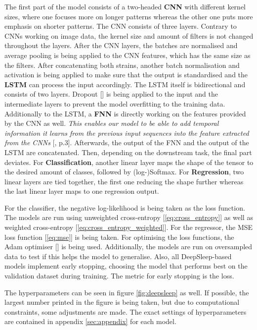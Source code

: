 \documentclass[11pt]{scrartcl}
\begin{document}
The first part of the model consists of a two-headed \textcolor{viridis1}{\textbf{CNN}} with different kernel sizes, where one focuses more on longer patterns whereas the other one puts more emphasis on shorter patterns. The CNN consists of three layers. Contrary to CNNs working on image data, the kernel size and amount of filters is not changed throughout the layers. After the CNN layers, the batches are normalised and average pooling is being applied to the CNN features, which has the same size as the filters. After concatenating both strains, another batch normalisation and activation is being applied to make sure that the output is standardised and the \textcolor{viridis3}{\textbf{LSTM}} can process the input accordingly. The LSTM itself is bidirectional and consists of two layers. Dropout [\cite{dropout}] is being applied to the input and the intermediate layers to prevent the model overfitting to the training data. Additionally to the LSTM, a \textcolor{viridis5}{\textbf{FNN}} is directly working on the features provided by the CNN as well. \textit{This enables our model to be able to add temporal information it learns from the previous input sequences into the feature extracted from the CNNs} [\cite{deepsleep}, p.3]. Afterwards, the output of the FNN and the output of the LSTM are concatenated. Then, depending on the downstream task, the final part deviates. For \textcolor{viridis7}{\textbf{Classification}}, another linear layer maps the shape of the tensor to the desired amount of classes, followed by (log-)Softmax. For \textcolor{viridis7}{\textbf{Regression}}, two linear layers are tied together, the first one reducing the shape further whereas the last linear layer maps to one regression output.

For the classifier, the negative log-likelihood is being taken as the loss function. The models are run using unweighted cross-entropy [\ref{eq:cross_entropy}] as well as weighted cross-entropy [\ref{eq:cross_entropy_weighted}]. For the regressor, the MSE loss function [\ref{eq:mse}] is being taken. For optimising the loss functions, the Adam optimiser [\cite{kingma2014adam}] is being used. Additionally, the models are run on oversampled data to test if this helps the model to generalise. Also, all DeepSleep-based models implement early stopping, choosing the model that performs best on the validation dataset during training. The metric for early stopping is the loss.

The hyperparameters can be seen in figure \ref{fig:deepsleep} as well. If possible, the largest number printed in the figure is being taken, but due to computational constraints, some adjustments are made. The exact settings of hyperparameters are contained in appendix \ref{sec:appendix} for each model.
\end{document}
